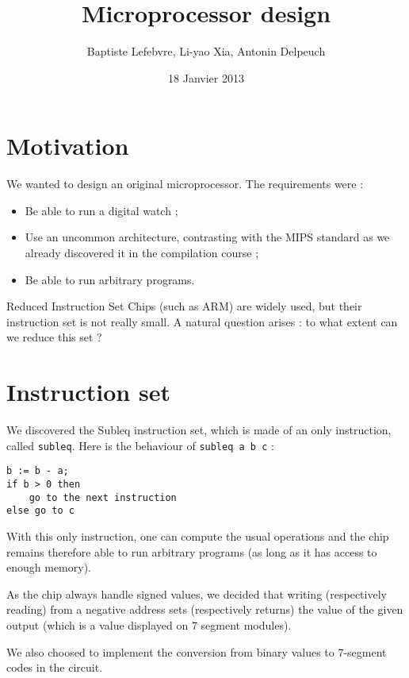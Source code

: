 \documentclass[a4paper]{article}
\begin{document}
\title{Microprocessor design}
\author{Baptiste Lefebvre, Li-yao Xia, Antonin Delpeuch}
\date{18 Janvier 2013}

\maketitle

\section{Motivation}

We wanted to design an original microprocessor. The requirements were :
\begin{itemize}
\item Be able to run a digital watch ;
\item Use an uncommon architecture, contrasting with the MIPS standard as we
already discovered it in the compilation course ;
\item Be able to run arbitrary programs.
\end{itemize}

Reduced Instruction Set Chips (such as ARM) are widely used, but their instruction set
is not really small. A natural question arises : to what extent can we
reduce this set ? 

\section{Instruction set}

We discovered the Subleq instruction set, which is made of an only
instruction, called \texttt{subleq}. Here is the behaviour of
\texttt{subleq a b c} :

\begin{verbatim}
b := b - a;
if b > 0 then
    go to the next instruction
else go to c
\end{verbatim}

With this only instruction, one can compute the usual operations
and the chip remains therefore able to run arbitrary programs
(as long as it has access to enough memory).

As the chip always handle signed values, we decided that writing
(respectively 
reading) from a negative address sets (respectively returns) the value of
the given output (which is a value displayed on 7 segment modules).

We also choosed to implement the conversion from binary values
to 7-segment codes in the circuit. 
\end{document}
